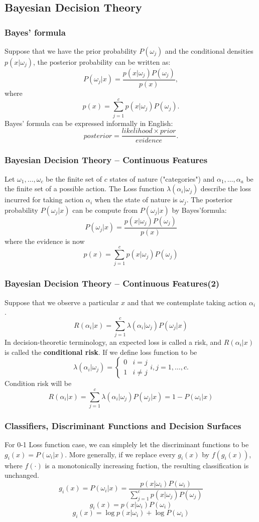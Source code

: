 \documentclass[slidestop,compress,mathserif]{beamer}
\begin{document}
    \subsection{Bayesian Decision Theory}
    \begin{frame}
    	\frametitle{Bayes' formula}
    	Suppose that we have the prior probability $P(\omega_j)$
    	and the conditional densities $p(x|\omega_j)$, the posterior
    	probability can be written as:
    	$$P(\omega_j|x)=\frac{p(x|\omega_j)P(\omega_j)}{p(x)},$$ 
    	where
    	$$p(x)=\sum_{j=1}^cp(x|\omega_j)P(\omega_j).$$
    	Bayes' formula can be expressed informally in English:
    	$$posterior = \frac{likelihood\times prior}{evidence}.$$
    \end{frame}
    \begin{frame}
    	\frametitle{Bayesian Decision Theory – Continuous Features}
    	Let $\omega_1,\ldots,\omega_c$ be the finite set of $c$ states of
    	nature ("categories") and $\alpha_1,\ldots,\alpha_a$ be the
    	finite set of a possible action. The Loss function $\lambda
    	(\alpha_i|\omega_j)$ describe the loss incurred for taking
    	action $\alpha_i$ when the state of nature is $\omega_j$. The
    	posterior probability $P(\omega_j|x)$ can be compute from 
    	$P(\omega_j|x)$ by Bayes'formula:
    	$$P(\omega_j|x)=\frac{p(x|\omega_j)P(\omega_j)}{p(x)}$$
    	where the evidence is now
    	$$p(x)=\sum_{j=1}^cp(x|\omega_j)P(\omega_j)$$
    	
    \end{frame}
    \begin{frame}
    	\frametitle{Bayesian Decision Theory – Continuous Features(2)}
    	Suppose that we observe a particular $x$ and that we 
    	contemplate taking action $\alpha_i$.
    	$$R(\alpha_i|x)=\sum_{j=1}^c\lambda(\alpha_i|\omega_j)
    	P(\omega_j|x)$$
    	In decision-theoretic terminology, an expected loss is called a risk,
    	and $R(\alpha_i|x)$ is called the \textbf{conditional risk}.
    	If we define loss function to be
    	$$\lambda(\alpha_i|\omega_j)=\left\{\begin{array}{ll}
    	0 & i=j\\
    	1 & i\neq j
    	\end{array}\right. i,j=1,\ldots,c.$$
    	Condition risk will be
    	$$R(\alpha_i|x) = \sum_{j=1}^c\lambda(\alpha_i|\omega_j)P(\omega_j|x)=1-P(\omega_i|x)$$	
    \end{frame}
    \begin{frame}
    	\frametitle{Classifiers, Discriminant Functions and Decision
    		Surfaces}
    	For 0-1 Loss function case, we can simplely let the discriminant functions to be $g_i(x)=P(\omega_i|x)$. More generally, if we replace every $g_i(x)$ by $f(g_i(x))$, where $f(\cdot)$ is a monotonically increasing fuction, the resulting classification is unchanged.
    	$$g_i(x)=P(\omega_i|x)=\frac{p(x|\omega_i)P(\omega_i)}{\sum_{j=1}^cp(x|\omega_j)P(\omega_j)}
    	$$
    	$$g_i(x) = p(x|\omega_i)P(\omega_i)$$
    	$$g_i(x) = \log p(x|\omega_i)+\log P(\omega_i)$$
    \end{frame}
\end{document}
